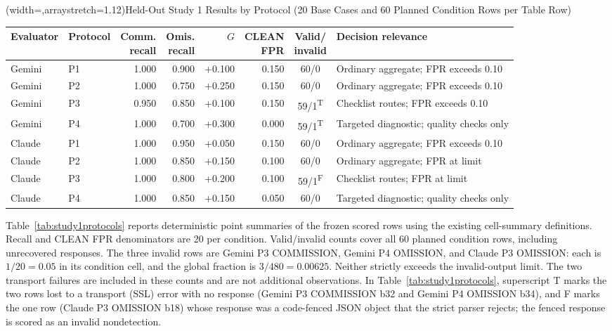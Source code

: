 \documentclass{ieeeaccess}
\newcommand{\thead}[1]{\shortstack[c]{#1}}
\begin{document}
\Table[t](width=\textwidth,arraystretch=1.12){Held-Out Study 1 Results by Protocol (20 Base Cases and 60 Planned Condition Rows per Table Row) \label{tab:study1protocols}}{\setlength{\tabcolsep}{4pt}\begin{tabularx}{\textwidth}{@{}llrrrrcL@{}}
\toprule
Evaluator & Protocol & \thead{Comm.\\recall} & \thead{Omis.\\recall} & $G$ & \thead{CLEAN\\FPR} & \thead{Valid/\\invalid} & Decision relevance\\
\midrule
Gemini & P1 & 1.000 & 0.900 & +0.100 & 0.150 & 60/0 & Ordinary aggregate; FPR exceeds 0.10\\
Gemini & P2 & 1.000 & 0.750 & +0.250 & 0.150 & 60/0 & Ordinary aggregate; FPR exceeds 0.10\\
Gemini & P3 & 0.950 & 0.850 & +0.100 & 0.150 & 59/1\textsuperscript{T} & Checklist routes; FPR exceeds 0.10\\
Gemini & P4 & 1.000 & 0.700 & +0.300 & 0.000 & 59/1\textsuperscript{T} & Targeted diagnostic; quality checks only\\
\addlinespace[3pt]
Claude & P1 & 1.000 & 0.950 & +0.050 & 0.150 & 60/0 & Ordinary aggregate; FPR exceeds 0.10\\
Claude & P2 & 1.000 & 0.850 & +0.150 & 0.100 & 60/0 & Ordinary aggregate; FPR at limit\\
Claude & P3 & 1.000 & 0.800 & +0.200 & 0.100 & 59/1\textsuperscript{F} & Checklist routes; FPR at limit\\
Claude & P4 & 1.000 & 0.850 & +0.150 & 0.050 & 60/0 & Targeted diagnostic; quality checks only\\
\bottomrule
\end{tabularx}}

Table~\ref{tab:study1protocols} reports deterministic point summaries of the frozen scored rows using the existing cell-summary definitions. Recall and CLEAN FPR denominators are 20 per condition. Valid/invalid counts cover all 60 planned condition rows, including unrecovered responses. The three invalid rows are Gemini P3 COMMISSION, Gemini P4 OMISSION, and Claude P3 OMISSION: each is $1/20=0.05$ in its condition cell, and the global fraction is $3/480=0.00625$. Neither strictly exceeds the invalid-output limit. The two transport failures are included in these counts and are not additional observations. In Table~\ref{tab:study1protocols}, superscript T marks the two rows lost to a transport (SSL) error with no response (Gemini P3 COMMISSION b32 and Gemini P4 OMISSION b34), and F marks the one row (Claude P3 OMISSION b18) whose response was a code-fenced JSON object that the strict parser rejects; the fenced response is scored as an invalid nondetection.
\end{document}
